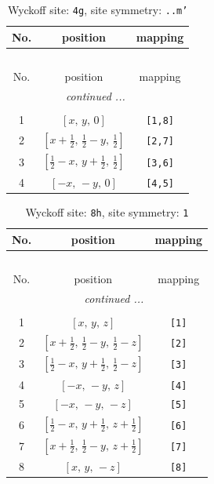 \documentclass[fleqn,8pt]{jsarticle}
\begin{document}
\renewcommand{\arraystretch}{1.2}
\begin{longtable}{ccc}
\caption{Wyckoff site: {\tt 4g}, site symmetry: {\tt ..m'}}
 \\
 \hline \hline
No. & position & mapping \\ \hline \endfirsthead

\multicolumn{2}{l}{\tablename\ \thetable{}} \\
 \hline \hline
No. & position & mapping \\ \hline \endhead

 \hline \hline
\multicolumn{2}{r}{\footnotesize\it continued ...} \\ \endfoot

 \hline \hline
\multicolumn{2}{r}{} \\ \endlastfoot

1 & $\left[ x,\, y,\, 0 \right]$ & {\tt [1,8]} \\ \hline
2 & $\left[ x + \frac{1}{2},\, \frac{1}{2} - y,\, \frac{1}{2} \right]$ & {\tt [2,7]} \\ \hline
3 & $\left[ \frac{1}{2} - x,\, y + \frac{1}{2},\, \frac{1}{2} \right]$ & {\tt [3,6]} \\ \hline
4 & $\left[ - x,\, - y,\, 0 \right]$ & {\tt [4,5]} \\
\end{longtable}
\renewcommand{\arraystretch}{1.2}
\begin{longtable}{ccc}
\caption{Wyckoff site: {\tt 8h}, site symmetry: {\tt 1}}
 \\
 \hline \hline
No. & position & mapping \\ \hline \endfirsthead

\multicolumn{2}{l}{\tablename\ \thetable{}} \\
 \hline \hline
No. & position & mapping \\ \hline \endhead

 \hline \hline
\multicolumn{2}{r}{\footnotesize\it continued ...} \\ \endfoot

 \hline \hline
\multicolumn{2}{r}{} \\ \endlastfoot

1 & $\left[ x,\, y,\, z \right]$ & {\tt [1]} \\ \hline
2 & $\left[ x + \frac{1}{2},\, \frac{1}{2} - y,\, \frac{1}{2} - z \right]$ & {\tt [2]} \\ \hline
3 & $\left[ \frac{1}{2} - x,\, y + \frac{1}{2},\, \frac{1}{2} - z \right]$ & {\tt [3]} \\ \hline
4 & $\left[ - x,\, - y,\, z \right]$ & {\tt [4]} \\ \hline
5 & $\left[ - x,\, - y,\, - z \right]$ & {\tt [5]} \\ \hline
6 & $\left[ \frac{1}{2} - x,\, y + \frac{1}{2},\, z + \frac{1}{2} \right]$ & {\tt [6]} \\ \hline
7 & $\left[ x + \frac{1}{2},\, \frac{1}{2} - y,\, z + \frac{1}{2} \right]$ & {\tt [7]} \\ \hline
8 & $\left[ x,\, y,\, - z \right]$ & {\tt [8]} \\
\end{longtable}
\end{document}
